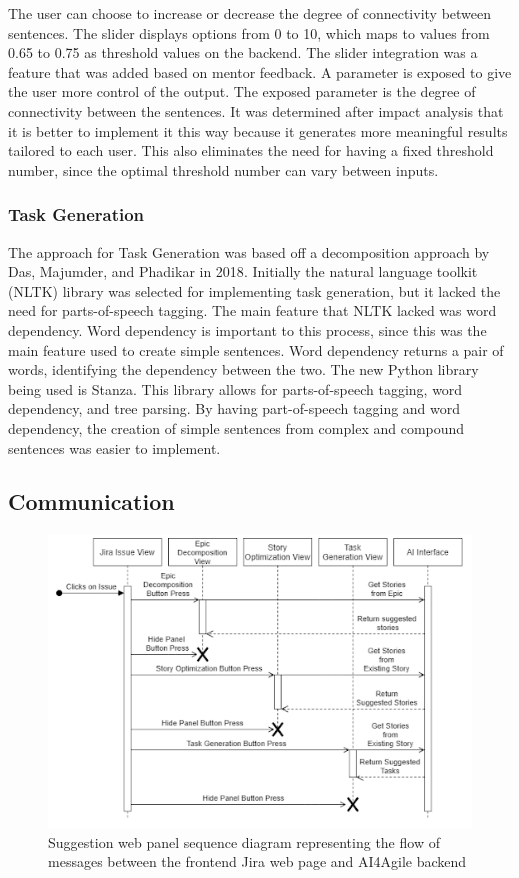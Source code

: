 The user can choose to increase or decrease the degree of connectivity between sentences. The slider displays options from 0 to 10, which maps to values from 0.65 to 0.75 as threshold values on the backend. The slider integration was a feature that was added based on mentor feedback. A parameter is exposed to give the user more control of the output. The exposed parameter is the degree of connectivity between the sentences. It was determined after impact analysis that it is better to implement it this way because it generates more meaningful results tailored to each user. This also eliminates the need for having a fixed threshold number, since the optimal threshold number can vary between inputs.

\subsubsection{Task Generation}
The approach for Task Generation was based off a decomposition approach by Das, Majumder, and Phadikar in 2018\cite{NLP1}. Initially the natural language toolkit (NLTK) library was selected for implementing task generation, but it lacked the need for parts-of-speech tagging. The main feature that NLTK lacked was word dependency. Word dependency is important to this process, since this was the main feature used to create simple sentences. Word dependency returns a pair of words, identifying the dependency between the two. The new Python library being used is Stanza. This library allows for parts-of-speech tagging, word dependency, and tree parsing. By having part-of-speech tagging and word dependency, the creation of simple sentences from complex and compound sentences was easier to implement.

\subsection{Communication}
\begin{figure}
\centerline{\includegraphics[width=\textwidth,height=\textheight,keepaspectratio]{./figure/SequenceFlowDiagram.png}}
\caption{Suggestion web panel sequence diagram representing the flow of messages between the frontend Jira web page and AI4Agile backend}
\end{figure}

